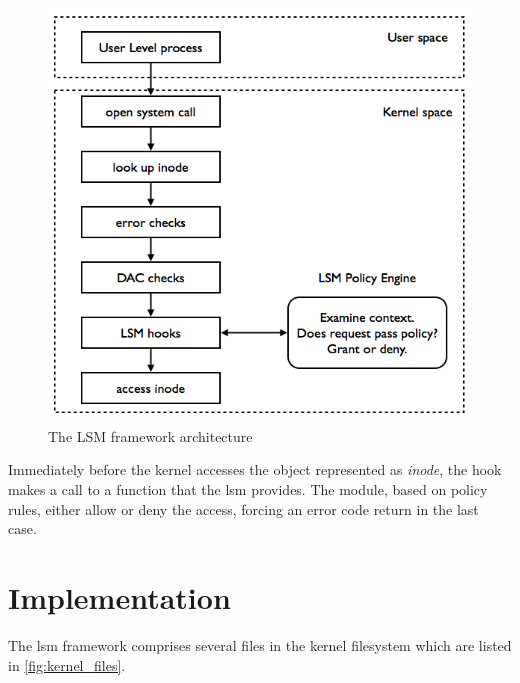 \begin{figure}[h]
 \centering
 \includegraphics[scale=0.5]{figures/lsm_arch.png}
 \caption{The LSM framework architecture}
 \label{fig:lsm_arch}
\end{figure}

Immediately before the kernel accesses the object represented as \textit{inode}, the hook makes a call to a function that the \gls{lsm} provides. The module, based on policy rules, either allow or deny the access, forcing an error code return in the last case.

\section{Implementation}

The \gls{lsm} framework comprises several files in the kernel filesystem which are listed in \autoref{fig:kernel_files}.

